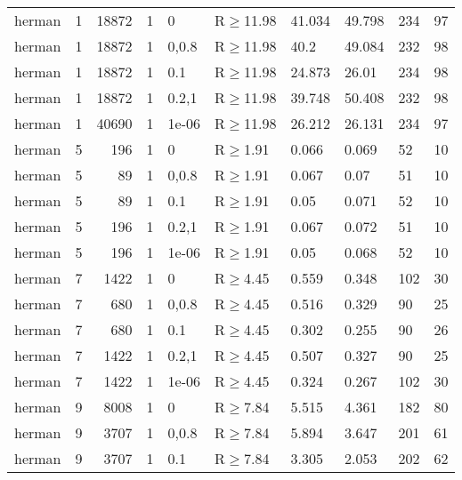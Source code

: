 \begin{longtable}{llrrllllll}
 herman        & 1         &  	18872 &   1 & 0     & R$\geq$11.98 & 41.034  & 49.798   & 234    & 97     \\
 herman        & 1         &  	18872 &   1 & 0,0.8 & R$\geq$11.98 & 40.2    & 49.084   & 232    & 98     \\
 herman        & 1         &  	18872 &   1 & 0.1   & R$\geq$11.98 & 24.873  & 26.01    & 234    & 98     \\
 herman        & 1         &  	18872 &   1 & 0.2,1 & R$\geq$11.98 & 39.748  & 50.408   & 232    & 98     \\
 herman        & 1         &  	40690 &   1 & 1e-06 & R$\geq$11.98 & 26.212  & 26.131   & 234    & 97     \\
 herman        & 5         &    	196 &   1 & 0     & R$\geq$1.91  & 0.066   & 0.069    & 52     & 10     \\
 herman        & 5         &     	89 &   1 & 0,0.8 & R$\geq$1.91  & 0.067   & 0.07     & 51     & 10     \\
 herman        & 5         &     	89 &   1 & 0.1   & R$\geq$1.91  & 0.05    & 0.071    & 52     & 10     \\
 herman        & 5         &    	196 &   1 & 0.2,1 & R$\geq$1.91  & 0.067   & 0.072    & 51     & 10     \\
 herman        & 5         &    	196 &   1 & 1e-06 & R$\geq$1.91  & 0.05    & 0.068    & 52     & 10     \\
 herman        & 7         &   	1422 &   1 & 0     & R$\geq$4.45  & 0.559   & 0.348    & 102    & 30     \\
 herman        & 7         &    	680 &   1 & 0,0.8 & R$\geq$4.45  & 0.516   & 0.329    & 90     & 25     \\
 herman        & 7         &    	680 &   1 & 0.1   & R$\geq$4.45  & 0.302   & 0.255    & 90     & 26     \\
 herman        & 7         &   	1422 &   1 & 0.2,1 & R$\geq$4.45  & 0.507   & 0.327    & 90     & 25     \\
 herman        & 7         &   	1422 &   1 & 1e-06 & R$\geq$4.45  & 0.324   & 0.267    & 102    & 30     \\
 herman        & 9         &   	8008 &   1 & 0     & R$\geq$7.84  & 5.515   & 4.361    & 182    & 80     \\
 herman        & 9         &   	3707 &   1 & 0,0.8 & R$\geq$7.84  & 5.894   & 3.647    & 201    & 61     \\
 herman        & 9         &   	3707 &   1 & 0.1   & R$\geq$7.84  & 3.305   & 2.053    & 202    & 62     \\

\end{longtable}
